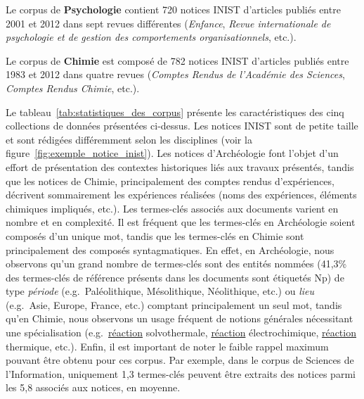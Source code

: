   Le corpus de \textbf{Psychologie} contient 720 notices INIST d'articles
  publiés entre 2001 et 2012 dans sept revues différentes
  (\textit{Enfance}, \textit{Revue internationale de psychologie et de gestion
  des comportements organisationnels}, etc.).

  Le corpus de \textbf{Chimie} est composé de 782 notices INIST d'articles
  publiés entre 1983 et 2012 dans quatre revues (\textit{Comptes Rendus de
  l'Académie des Sciences}, \textit{Comptes Rendus Chimie}, etc.).

  Le tableau~\ref{tab:statistiques_des_corpus} présente les caractéristiques des
  cinq collections de données présentées ci-dessus.
  Les notices INIST sont de petite taille et sont rédigées différemment selon
  les disciplines (voir la figure~\ref{fig:exemple_notice_inist}). Les notices
  d'Archéologie font l'objet d'un effort de présentation des contextes
  historiques liés aux travaux présentés, tandis que les notices de Chimie,
  principalement des comptes rendus d'expériences, décrivent sommairement les
  expériences réalisées (noms des expériences, éléments chimiques impliqués,
  etc.). Les termes-clés associés aux documents varient en nombre et en
  complexité. Il est fréquent que les termes-clés en Archéologie soient composés
  d'un unique mot, tandis que les termes-clés en Chimie sont principalement des
  composés syntagmatiques. En effet, en Archéologie, nous observons qu'un grand
  nombre de termes-clés sont des entités nommées (41,3\% des termes-clés de
  référence présents dans les documents sont étiquetés Np) de type
  \textit{période} (e.g.~\og{}Paléolithique\fg{}, \og{}Mésolithique\fg{},
  \og{}Néolithique\fg{}, etc.) ou \textit{lieu} (e.g.~\og{}Asie\fg{},
  \og{}Europe\fg{}, \og{}France\fg{}, etc.) comptant principalement un seul mot,
  tandis qu'en Chimie, nous observons un usage fréquent de notions générales
  nécessitant une spécialisation (e.g.~\og{}\underline{réaction}
  solvothermale\fg{}, \og{}\underline{réaction} électrochimique\fg{},
  \og{}\underline{réaction} thermique\fg{}, etc.). Enfin, il est important de
  noter le faible rappel maximum pouvant être obtenu pour ces corpus. Par
  exemple, dans le corpus de Sciences de l'Information, uniquement 1,3
  termes-clés peuvent être extraits des notices parmi les 5,8 associés aux
  notices, en moyenne.
